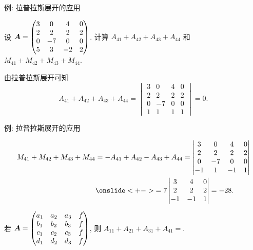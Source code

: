 \begin{frame}{例: 拉普拉斯展开的应用}
	\onslide<+->
	\begin{example}
		设 ${\boldsymbol{A}}=\begin{pmatrix}
			3&0&4&0\\
			2&2&2&2\\
			0&-7&0&0\\
			5&3&-2&2
		\end{pmatrix}$.
		计算 $A_{41}+A_{42}+A_{43}+A_{44}$ 和 $M_{41}+M_{42}+M_{43}+M_{44}$.
	\end{example}
	\onslide<+->
	\begin{solution}
		由拉普拉斯展开可知
		\[A_{41}+A_{42}+A_{43}+A_{44}
		=\begin{vmatrix}
			3&0&4&0\\
			2&2&2&2\\
			0&-7&0&0\\
			1&1&1&1
		\end{vmatrix}=0.\]
	\end{solution}
\end{frame}


\begin{frame}{例: 拉普拉斯展开的应用}
	\onslide<+->
		\begin{solution}[续解]
			\vspace{-\baselineskip}
			\begin{align*}
				M_{41}+M_{42}+M_{43}+M_{44}
				&=-A_{41}+A_{42}-A_{43}+A_{44}
				=\begin{vmatrix}
					3&0&4&0\\
					2&2&2&2\\
					0&-7&0&0\\
					-1&1&-1&1
				\end{vmatrix}\\
				&\onslide<+->{=7\begin{vmatrix}
					3&4&0\\
					2&2&2\\
					-1&-1&1
				\end{vmatrix}=-28.}
		\end{align*}
	\end{solution}
	\onslide<+->
	\begin{exercise}
		若 ${\boldsymbol{A}}=\begin{pmatrix}
			a_1&a_2&a_3&f\\
			b_1&b_2&b_3&f\\
			c_1&c_2&c_3&f\\
			d_1&d_2&d_3&f
		\end{pmatrix}$,
		则 $A_{11}+A_{21}+A_{31}+A_{41}=$.
		\vspace{-.2\baselineskip}
	\end{exercise}
\end{frame}


